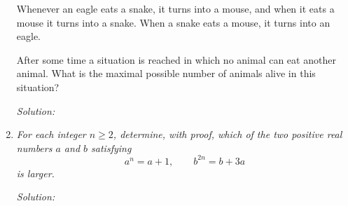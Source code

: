 \documentclass{article}
\begin{document}
\begin{enumerate}[1.]
{Whenever an eagle eats a snake, it turns into a mouse, and when it eats a mouse it turns into a snake. When a snake eats a mouse, it turns into an eagle.

After some time a situation is reached in which no animal can eat another animal.
What is the maximal possible number of animals alive in this situation?}

\textit{Solution:}


\item %
{\itshape
For each integer $n \geq 2$, determine, with proof, which of the two positive real numbers $a$ and $b$ satisfying
\[ a^n = a+1, \qquad b^{2n} = b+3a \]
is larger.}

\textit{Solution:}


\end{enumerate}
\end{document}
